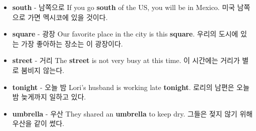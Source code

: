 \documentclass{article}
\begin{document}
\begin{addmargin}[1em]{1em}
\begin{itemize}
        \item \fontsize{12pt}{14pt}\selectfont \textbf{south} - 남쪽으로 \newline
        If you go \textbf{south} of the US, you will be in Mexico. \newline
        미국 남쪽으로 가면 멕시코에 있을 것이다.
        
        \item \fontsize{12pt}{14pt}\selectfont \textbf{square} - 광장 \newline
        Our favorite place in the city is this \textbf{square}. \newline
        우리의 도시에 있는 가장 좋아하는 장소는 이 광장이다.
        
        \item \fontsize{12pt}{14pt}\selectfont \textbf{street} - 거리 \newline
        The \textbf{street} is not very busy at this time. \newline
        이 시간에는 거리가 별로 붐비지 않는다.
        
        \item \fontsize{12pt}{14pt}\selectfont \textbf{tonight} - 오늘 밤 \newline
        Lori's husband is working late \textbf{tonight}. \newline
        로리의 남편은 오늘 밤 늦게까지 일하고 있다.
        
        \item \fontsize{12pt}{14pt}\selectfont \textbf{umbrella} - 우산 \newline
        They shared an \textbf{umbrella} to keep dry. \newline
        그들은 젖지 않기 위해 우산을 같이 썼다.
    \end{itemize}
\end{addmargin}
\end{document}
